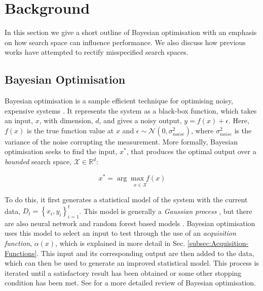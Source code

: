 \documentclass[preprint]{elsarticle}
\begin{document}



\section{Background\label{sec:Background}}
In this section we give a short outline of Bayesian optimisation with an emphasis on how search space can influence performance. We also discuss how previous works have attempted to rectify misspecified search spaces. 
\subsection{Bayesian Optimisation}

Bayesian optimisation is a sample efficient technique for optimising noisy,
expensive systems \citep{mockus1994application}. It represents the system as a black-box function, which takes an input, $x$, with dimension, $d$, and gives a noisy output, $y=f(x)+\epsilon$. Here, $f(x)$ is the true function value at $x$ and $\epsilon \sim \mathcal{N}(0, \sigma^2_{noise})$, where $\sigma^2_{noise}$ is the variance of the noise corrupting the measurement. More formally, Bayesian optimisation seeks to find the input, $x^*$, that produces the optimal output over a \emph{bounded} search space, $\mathcal{X}\in\mathbb{R}^d$:
\begin{linenomath*}
\begin{equation}
x^{*}=\underset{x\in\mathcal{X}}{\arg\max f(x)}
\end{equation}
\end{linenomath*}
To do this, it first generates a statistical model of the system with the current data, $D_t=\left\lbrace x_i,y_i\right\rbrace^t_{i=1}$. This model is generally a \emph{Gaussian process} \citep{Rasmussen2006}, but there are also neural network and random forest based models \citep{snoek2015scalable}. Bayesian optimisation uses this model to select an input to test through the use of an \emph{acquisition function}, $\alpha(x)$, which is explained in more detail in Sec. \ref{subsec:Acquisition-Functions}. This input and its corresponding output are then added to the data, which can then be used to generate an improved statistical model. This process is iterated until a satisfactory result has been obtained or some other stopping condition has been met. See \cite{Brochu2010} for a more detailed review of Bayesian optimisation.
\end{document}
